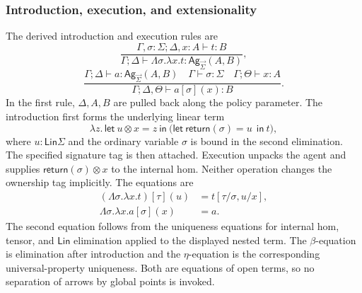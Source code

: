 \documentclass[11pt,a4paper]{article}
\numberwithin{equation}{section}
\theoremstyle{definition}
\theoremstyle{remark}
\theoremstyle{plain}
\providecommand{\Ag}{\mathsf{Ag}}
\providecommand{\sig}{\vec{\Sigma}}
\providecommand{\Lin}{\mathsf{Lin}}
\providecommand{\ordturn}{\vdash}
\providecommand{\linturn}{\vdash}
\begin{document}
\subsubsection{Introduction, execution, and extensionality}

The derived introduction and execution rules are
\[
 \frac{\Gamma,\sigma:\Sigma;\Delta,x:A\linturn t:B}
      {\Gamma;\Delta\linturn
        \Lambda\sigma.\lambda x.t:\Ag_{\sig}(A,B)},
\]
\[
 \frac{\Gamma;\Delta\linturn a:\Ag_{\sig}(A,B)\quad
       \Gamma\ordturn\sigma:\Sigma\quad
       \Gamma;\Theta\linturn x:A}
      {\Gamma;\Delta,\Theta\linturn a[\sigma](x):B}.
\]
In the first rule, $\Delta,A,B$ are pulled back along the policy parameter.
The introduction first forms the underlying linear term
\[
 \lambda z.\,\mathsf{let}\ u\otimes x=z\ \mathsf{in}\
 \bigl(\mathsf{let}\ \mathsf{return}(\sigma)=u\
       \ \mathsf{in}\ t\bigr),
\]
where $u:\Lin\Sigma$ and the ordinary variable $\sigma$ is bound in
the second elimination.  The specified signature tag is then attached.
Execution unpacks the agent and supplies
$\mathsf{return}(\sigma)\otimes x$ to the internal hom.  Neither
operation changes the ownership tag implicitly.
The equations are
\begin{align}
 (\Lambda\sigma.\lambda x.t)[\tau](u)&=t[\tau/\sigma,u/x],
 \label{agt-eq-agent-beta}\\
 \Lambda\sigma.\lambda x.a[\sigma](x)&=a.
 \label{agt-eq-agent-eta}
\end{align}
The second equation follows from the uniqueness equations for internal
hom, tensor, and $\Lin$ elimination applied to the displayed nested term.
The $\beta$-equation is elimination after introduction and the $\eta$-equation
is the corresponding universal-property uniqueness.  Both are equations of
open terms, so no separation of arrows by global points is invoked.
\end{document}

